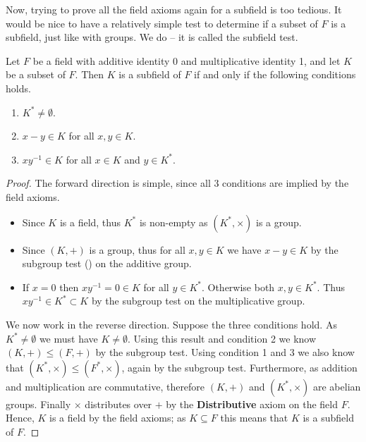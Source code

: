 Now, trying to prove all the field axioms again for a subfield is too tedious. It would be nice to have a relatively simple test to determine if a subset of $F$ is a subfield, just like with groups. We do -- it is called the subfield test.

\begin{theorem}\label{thrm-subfield-test}
    Let $F$ be a field with additive identity 0 and multiplicative identity 1, and let $K$ be a subset of $F$. Then $K$ is a subfield of $F$ if and only if the following conditions holds.
    \begin{enumerate}
        \item $K^\ast \neq \emptyset$.
        \item $x - y \in K$ for all $x, y \in K$.
        \item $xy^{-1} \in K$ for all $x \in K$ and $y \in K^\ast$.
    \end{enumerate}
\end{theorem}
\begin{proof}
    The forward direction is simple, since all 3 conditions are implied by the field axioms.
    \begin{itemize}
        \item Since $K$ is a field, thus $K^\ast$ is non-empty as $(K^\ast, \times)$ is a group.
        \item Since $(K, +)$ is a group, thus for all $x, y \in K$ we have $x - y \in K$ by the subgroup test () on the additive group.
        \item If $x = 0$ then $xy^{-1} = 0 \in K$ for all $y \in K^\ast$. Otherwise both $x, y \in K^\ast$. Thus $xy^{-1} \in K^\ast \subset K$ by the subgroup test on the multiplicative group.
    \end{itemize}

    We now work in the reverse direction. Suppose the three conditions hold. As $K^\ast \neq \emptyset$ we must have $K \neq \emptyset$. Using this result and condition 2 we know $(K, +) \leq (F, +)$ by the subgroup test. Using condition 1 and 3 we also know that $(K^\ast, \times) \leq (F^\ast, \times)$, again by the subgroup test. Furthermore, as addition and multiplication are commutative, therefore $(K, +)$ and $(K^\ast, \times)$ are abelian groups. Finally $\times$ distributes over $+$ by the \textbf{Distributive} axiom on the field $F$. Hence, $K$ is a field by the field axioms; as $K \subseteq F$ this means that $K$ is a subfield of $F$.
\end{proof}

